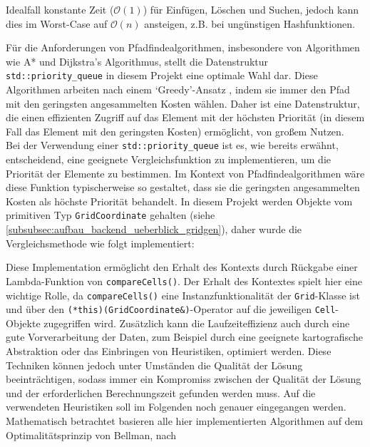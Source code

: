 \begin{itemize}
\begin{itemize}
        Idealfall konstante Zeit ($\mathcal{O}(1)$) für Einfügen, Löschen und Suchen, jedoch kann dies im Worst-Case auf $\mathcal{O}(n)$
        ansteigen, z.B. bei ungünstigen Hashfunktionen.
    \end{itemize}
    Für die Anforderungen von Pfadfindealgorithmen, insbesondere von Algorithmen wie A* und Dijkstra's Algorithmus,
    stellt die Datenstruktur \texttt{std::priority\_queue} in diesem Projekt eine optimale Wahl dar.
    Diese Algorithmen arbeiten nach einem `Greedy'-Ansatz \cite{korte2006}, indem sie immer den Pfad mit den geringsten angesammelten Kosten wählen.
    Daher ist eine Datenstruktur, die einen effizienten Zugriff auf das Element mit der höchsten Priorität (in diesem Fall
    das Element mit den geringsten Kosten) ermöglicht, von großem Nutzen.\\
    Bei der Verwendung einer \texttt{std::priority\_queue} ist es, wie bereits erwähnt, entscheidend, eine geeignete Vergleichsfunktion
    zu implementieren, um die Priorität der Elemente zu bestimmen.
    Im Kontext von Pfadfindealgorithmen wäre diese Funktion typischerweise so gestaltet, dass sie die geringsten angesammelten
    Kosten als höchste Priorität behandelt.
    In diesem Projekt werden Objekte vom primitiven Typ \texttt{GridCoordinate} gehalten (siehe \ref{subsubsec:aufbau_backend_ueberblick_gridgen}),
    daher wurde die Vergleichsmethode wie folgt implementiert:
    
    Diese Implementation ermöglicht den Erhalt des Kontexts durch Rückgabe einer Lambda-Funktion von \texttt{compareCells()}.
    Der Erhalt des Kontextes spielt hier eine wichtige Rolle, da \texttt{compareCells()} eine Instanzfunktionalität der
    \texttt{Grid}-Klasse ist und über den \texttt{(*this)(GridCoordinate\&)}-Operator auf die jeweiligen \texttt{Cell}-Objekte
    zugegriffen wird.
    Zusätzlich kann die Laufzeiteffizienz auch durch eine gute Vorverarbeitung der Daten, zum Beispiel durch eine geeignete
    kartografische Abstraktion oder das Einbringen von Heuristiken, optimiert werden.
    Diese Techniken können jedoch unter Umständen die Qualität der Lösung beeinträchtigen, sodass immer ein Kompromiss zwischen
    der Qualität der Lösung und der erforderlichen Berechnungszeit gefunden werden muss.
    Auf die verwendeten Heuristiken soll im Folgenden noch genauer eingegangen werden.\\
    Mathematisch betrachtet basieren alle hier implementierten Algorithmen \cite{morin1982} auf dem Optimalitätsprinzip von Bellman, nach

\end{itemize}
